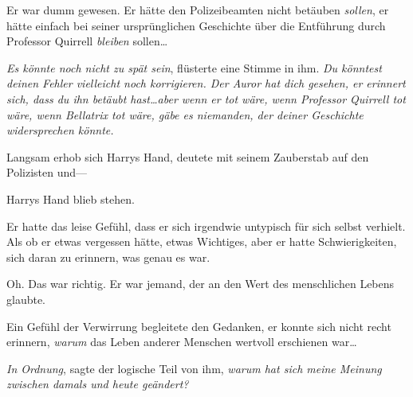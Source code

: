 Er war dumm gewesen. Er hätte den Polizeibeamten nicht betäuben \emph{sollen}, er hätte einfach bei seiner ursprünglichen Geschichte über die Entführung durch Professor Quirrell \emph{bleiben} sollen…

\emph{Es könnte noch nicht zu spät sein}, flüsterte eine Stimme in ihm. \emph{Du könntest deinen Fehler vielleicht noch korrigieren. Der Auror hat dich gesehen, er erinnert sich, dass du ihn betäubt hast…aber wenn er tot wäre, wenn Professor Quirrell tot wäre, wenn Bellatrix tot wäre, gäbe es niemanden, der deiner Geschichte widersprechen könnte.}

Langsam erhob sich Harrys Hand, deutete mit seinem Zauberstab auf den Polizisten und—

Harrys Hand blieb stehen.

Er hatte das leise Gefühl, dass er sich irgendwie untypisch für sich selbst verhielt. Als ob er etwas vergessen hätte, etwas Wichtiges, aber er hatte Schwierigkeiten, sich daran zu erinnern, was genau es war.

Oh. Das war richtig. Er war jemand, der an den Wert des menschlichen Lebens glaubte.

Ein Gefühl der Verwirrung begleitete den Gedanken, er konnte sich nicht recht erinnern, \emph{warum} das Leben anderer Menschen wertvoll erschienen war…

\emph{In Ordnung}, sagte der logische Teil von ihm, \emph{warum hat sich meine Meinung zwischen damals und heute geändert?}

